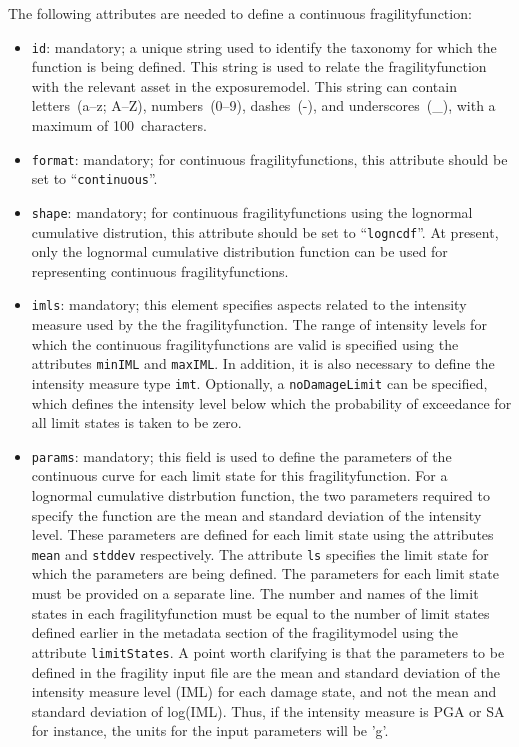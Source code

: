 The following attributes are needed to define a continuous \gls{fragilityfunction}:

\begin{itemize}

    \item \Verb+id+: mandatory; a unique string used to identify the 
      \gls{taxonomy} for which the function is being defined. This string is
      used to relate the \gls{fragilityfunction} with the relevant \gls{asset}
      in the \gls{exposuremodel}. This string can contain letters~(a--z; A--Z),
      numbers~(0--9), dashes~(-), and underscores~(\_), with a maximum of
      100~characters.

    \item \Verb+format+: mandatory; for continuous \glspl{fragilityfunction},
      this attribute should be set to ``\Verb+continuous+''.

    \item \Verb+shape+: mandatory; for continuous \glspl{fragilityfunction}
      using the lognormal cumulative distrution, this attribute should be set
      to ``\Verb+logncdf+''. At present, only the lognormal cumulative
      distribution function can be used for representing continuous
      \glspl{fragilityfunction}.

    \item \Verb+imls+: mandatory; this element specifies aspects related to the
      intensity measure used by the the \gls{fragilityfunction}. The range of 
      intensity levels for which the continuous \glspl{fragilityfunction} are valid
      is specified using the attributes \Verb+minIML+ and \Verb+maxIML+. 
      In addition, it is also necessary to define the intensity measure type 
      \Verb+imt+. Optionally, a \Verb+noDamageLimit+ can be specified, which 
      defines the intensity level below which the probability of exceedance 
      for all limit states is taken to be zero.

    \item \Verb+params+: mandatory; this field is used to define the parameters
      of the continuous curve for each limit state for this 
      \gls{fragilityfunction}. For a lognormal cumulative distrbution function, 
      the two parameters required to specify the function are the mean and 
      standard deviation of the intensity level. These parameters are defined for 
      each limit state using the attributes \Verb+mean+ and \Verb+stddev+ 
      respectively. The attribute \Verb+ls+ specifies the limit state for which 
      the parameters are being defined. The parameters for each limit state
      must be provided on a separate line. The number and names of the limit 
      states in each \gls{fragilityfunction} must be equal to the number of limit 
      states defined earlier in the metadata section of the \gls{fragilitymodel}
      using the attribute \Verb+limitStates+. A point worth clarifying is that the
      parameters to be defined in the fragility input file are the mean and 
      standard deviation of the intensity measure level (IML) for each damage state,
      and not the mean and standard deviation of log(IML). Thus, if the intensity
      measure is PGA or SA for instance, the units for the input parameters will be 'g'.



\end{itemize}
